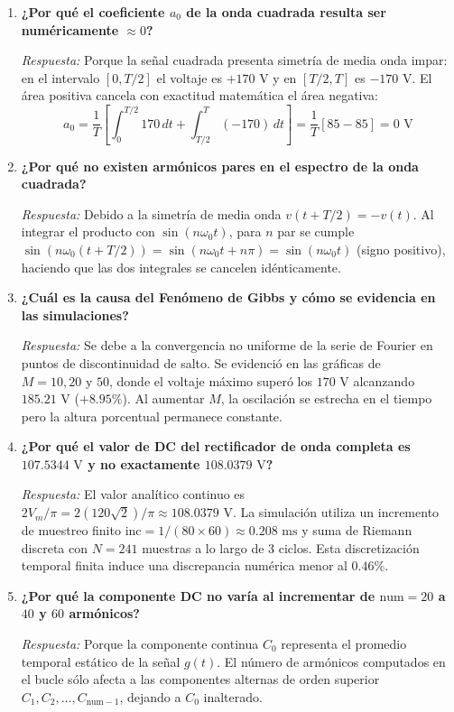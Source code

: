 \documentclass[11pt,a4paper]{article}
\begin{document}
\begin{enumerate}[leftmargin=*]
    \item \textbf{¿Por qué el coeficiente $a_0$ de la onda cuadrada resulta ser numéricamente $\approx 0$?}
    
    \textit{Respuesta:} Porque la señal cuadrada presenta simetría de media onda impar: en el intervalo $[0, T/2]$ el voltaje es $+170\text{ V}$ y en $[T/2, T]$ es $-170\text{ V}$. El área positiva cancela con exactitud matemática el área negativa:
    \[
    a_0 = \frac{1}{T} \left[ \int_0^{T/2} 170\,dt + \int_{T/2}^T (-170)\,dt \right] = \frac{1}{T} [85 - 85] = 0\text{ V}
    \]

    \item \textbf{¿Por qué no existen armónicos pares en el espectro de la onda cuadrada?}
    
    \textit{Respuesta:} Debido a la simetría de media onda $v(t + T/2) = -v(t)$. Al integrar el producto con $\sin(n\omega_0 t)$, para $n$ par se cumple $\sin(n\omega_0 (t + T/2)) = \sin(n\omega_0 t + n\pi) = \sin(n\omega_0 t)$ (signo positivo), haciendo que las dos integrales se cancelen idénticamente.

    \item \textbf{¿Cuál es la causa del Fenómeno de Gibbs y cómo se evidencia en las simulaciones?}
    
    \textit{Respuesta:} Se debe a la convergencia no uniforme de la serie de Fourier en puntos de discontinuidad de salto. Se evidenció en las gráficas de $M = 10, 20 \text{ y } 50$, donde el voltaje máximo superó los $170\text{ V}$ alcanzando $185.21\text{ V}$ ($+8.95\%$). Al aumentar $M$, la oscilación se estrecha en el tiempo pero la altura porcentual permanece constante.

    \item \textbf{¿Por qué el valor de DC del rectificador de onda completa es $107.5344\text{ V}$ y no exactamente $108.0379\text{ V}$?}
    
    \textit{Respuesta:} El valor analítico continuo es $2V_m/\pi = 2(120\sqrt{2})/\pi \approx 108.0379\text{ V}$. La simulación utiliza un incremento de muestreo finito $\text{inc} = 1/(80 \times 60) \approx 0.208\text{ ms}$ y suma de Riemann discreta con $N = 241$ muestras a lo largo de 3 ciclos. Esta discretización temporal finita induce una discrepancia numérica menor al $0.46\%$.

    \item \textbf{¿Por qué la componente DC no varía al incrementar de $\text{num} = 20$ a $40$ y $60$ armónicos?}
    
    \textit{Respuesta:} Porque la componente continua $C_0$ representa el promedio temporal estático de la señal $g(t)$. El número de armónicos computados en el bucle sólo afecta a las componentes alternas de orden superior $C_1, C_2, \dots, C_{\text{num}-1}$, dejando a $C_0$ inalterado.
\end{enumerate}
\end{document}
